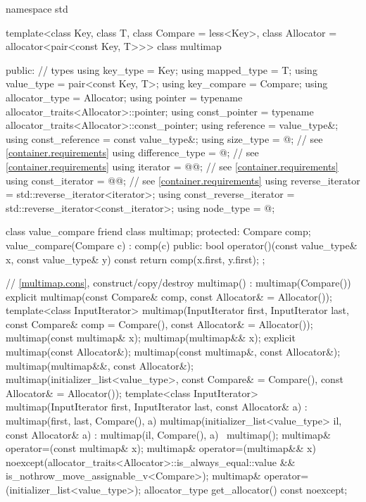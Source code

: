 \begin{codeblock}
namespace std {
  template<class Key, class T, class Compare = less<Key>,
           class Allocator = allocator<pair<const Key, T>>>
  class multimap {
  public:
    // types
    using key_type               = Key;
    using mapped_type            = T;
    using value_type             = pair<const Key, T>;
    using key_compare            = Compare;
    using allocator_type         = Allocator;
    using pointer                = typename allocator_traits<Allocator>::pointer;
    using const_pointer          = typename allocator_traits<Allocator>::const_pointer;
    using reference              = value_type&;
    using const_reference        = const value_type&;
    using size_type              = @\impdef@; // see \ref{container.requirements}
    using difference_type        = @\impdef@; // see \ref{container.requirements}
    using iterator               = @@; // see \ref{container.requirements}
    using const_iterator         = @@; // see \ref{container.requirements}
    using reverse_iterator       = std::reverse_iterator<iterator>;
    using const_reverse_iterator = std::reverse_iterator<const_iterator>;
    using node_type              = @\unspec@;

    class value_compare {
      friend class multimap;
    protected:
      Compare comp;
      value_compare(Compare c) : comp(c) { }
    public:
      bool operator()(const value_type& x, const value_type& y) const {
        return comp(x.first, y.first);
      }
    };

    // \ref{multimap.cons}, construct/copy/destroy
    multimap() : multimap(Compare()) { }
    explicit multimap(const Compare& comp, const Allocator& = Allocator());
    template<class InputIterator>
      multimap(InputIterator first, InputIterator last,
               const Compare& comp = Compare(),
               const Allocator& = Allocator());
    multimap(const multimap& x);
    multimap(multimap&& x);
    explicit multimap(const Allocator&);
    multimap(const multimap&, const Allocator&);
    multimap(multimap&&, const Allocator&);
    multimap(initializer_list<value_type>,
      const Compare& = Compare(),
      const Allocator& = Allocator());
    template<class InputIterator>
      multimap(InputIterator first, InputIterator last, const Allocator& a)
        : multimap(first, last, Compare(), a) { }
    multimap(initializer_list<value_type> il, const Allocator& a)
      : multimap(il, Compare(), a) { }
    ~multimap();
    multimap& operator=(const multimap& x);
    multimap& operator=(multimap&& x)
      noexcept(allocator_traits<Allocator>::is_always_equal::value &&
               is_nothrow_move_assignable_v<Compare>);
    multimap& operator=(initializer_list<value_type>);
    allocator_type get_allocator() const noexcept;

}}
\end{codeblock}
